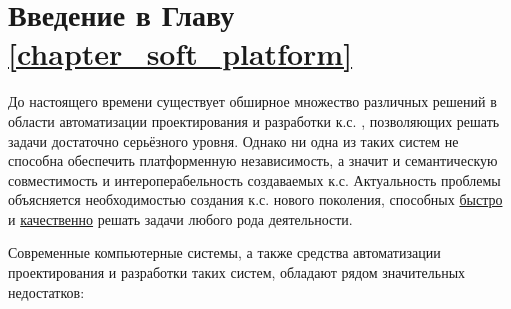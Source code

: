 \section*{Введение в Главу \ref{chapter_soft_platform}~}

До настоящего времени существует обширное множество различных решений в области автоматизации проектирования и разработки к.с. \cite{iliadis2019tower}, позволяющих решать задачи достаточно серьёзного уровня. Однако ни одна из таких систем не способна обеспечить платформенную независимость, а значит и семантическую совместимость и интероперабельность создаваемых к.с. Актуальность проблемы объясняется необходимостью создания к.с. нового поколения, способных \underline{быстро} и \underline{качественно} решать задачи любого рода деятельности.

Современные компьютерные системы, а также средства автоматизации проектирования и разработки таких систем, обладают рядом значительных недостатков:

